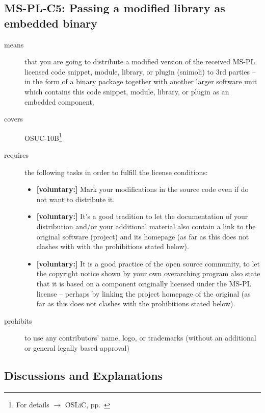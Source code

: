 \subsection{MS-PL-C5: Passing a modified library as embedded binary}
\label{OSUC-10B-MS-PL}
\begin{description}
\item[means] that you are going to distribute a modified version of the received
MS-PL licensed code snippet, module, library, or plugin (snimoli) to 3rd parties
-- in the form of a binary package together with another larger software unit
which contains this code snippet, module, library, or plugin as an embedded
component.

\item[covers] OSUC-10B\footnote{For details $\rightarrow$ OSLiC, pp.\
\pageref{OSUC-10B-DEF}}
\item[requires] the following tasks in order to fulfill the license conditions:
\begin{itemize}
 
  \item \textbf{[voluntary:]} Mark your modifications in the source code even if
  do not want to distribute it.
  
  \item \textbf{[voluntary:]} It's a good tradition to let the documentation of
  your distribution and/or your additional material also contain a link to the
  original software (project) and its homepage (as far as this does not clashes
  with with the prohibitions stated below).
  
  \item \textbf{[voluntary:]} It is a good practice of the open source
  community, to let the copyright notice shown by your own overarching program
  also state that it is based on a component originally licensed under the MS-PL
  license -- perhaps by linking the project homepage of the original (as far as
  this does not clashes with the prohibitions stated below).
  
\end{itemize}

\item[prohibits] to use any contributors' name, logo, or trademarks (without an
additional or general legally based approval)

\end{description}

\subsection{Discussions and Explanations}

